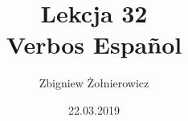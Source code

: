 \documentclass{article}
\begin{document}
    \title{
        {\huge Lekcja 32} \\
        {\large Verbos Espa\~{n}ol}
    }
    \author{Zbigniew Żołnierowicz}
    \date{22.03.2019}
    \maketitle
\end{document}
